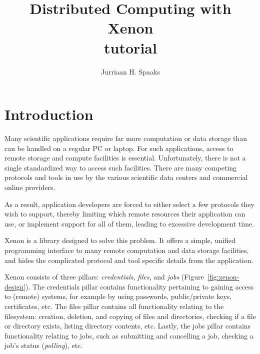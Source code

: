 \documentclass[12pt, a4paper, twoside, openany, titlepage]{book}
\author{Jurriaan H. Spaaks}
\title{\textbf{Distributed Computing with Xenon} \\ tutorial}
\newcommand{\insertemptypage}[0]{
\vfill
\newpage
\thispagestyle{empty}
\mbox{}
\pagebreak
}
\begin{document}
\frontmatter

\maketitle

\insertemptypage{}

\pagestyle{plain}


\tableofcontents
\insertemptypage{}

\mainmatter












\chapter{Introduction}

Many scientific applications require far more computation or data storage than can be handled on a regular PC or laptop. For such applications, access to remote storage and compute facilities is essential. Unfortunately, there is not a single standardized way to access such facilities. There are many competing protocols and tools in use by the various scientific data centers and commercial online providers.

As a result, application developers are forced to either select a few protocols they wish to support, thereby limiting which remote resources their application can use, or implement support for all of them, leading to excessive development time.

Xenon is a library designed to solve this problem. It offers a simple, unified programming interface to many remote computation and data storage facilities, and hides the complicated protocol and tool specific details from the application.

Xenon consists of three pillars: \textit{credentials}, \textit{files}, and \textit{jobs} (Figure~\ref{fig:xenon-design}).
%
The credentials pillar contains functionality pertaining to gaining access to (remote) systems, for example by using passwords, public/private keys, certificates, etc.
%
The files pillar contains all functionality relating to the filesystem: creation, deletion, and copying of files and directories, checking if a file or directory exists, listing directory contents, etc.
%
Lastly, the jobs pillar contains functionality relating to jobs, such as submitting and cancelling a job, checking a job's status (\textit{polling}), etc.
\end{document}
